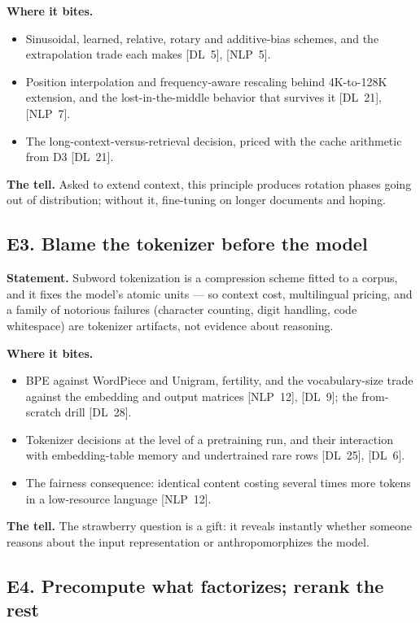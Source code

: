 \textbf{Where it bites.}
\begin{itemize}[itemsep=1pt,topsep=2pt,leftmargin=1.3em]
\item Sinusoidal, learned, relative, rotary and additive-bias schemes, and the extrapolation trade each makes [DL~5], [NLP~5].
\item Position interpolation and frequency-aware rescaling behind 4K-to-128K extension, and the lost-in-the-middle behavior that survives it [DL~21], [NLP~7].
\item The long-context-versus-retrieval decision, priced with the cache arithmetic from D3 [DL~21].
\end{itemize}

\textbf{The tell.} Asked to extend context, this principle produces rotation phases going out of distribution; without it, fine-tuning on longer documents and hoping.

\subsection*{E3. Blame the tokenizer before the model}

\textbf{Statement.} Subword tokenization is a compression scheme fitted to a corpus, and it fixes the model's atomic units --- so context cost, multilingual pricing, and a family of notorious failures (character counting, digit handling, code whitespace) are tokenizer artifacts, not evidence about reasoning.

\textbf{Where it bites.}
\begin{itemize}[itemsep=1pt,topsep=2pt,leftmargin=1.3em]
\item BPE against WordPiece and Unigram, fertility, and the vocabulary-size trade against the embedding and output matrices [NLP~12], [DL~9]; the from-scratch drill [DL~28].
\item Tokenizer decisions at the level of a pretraining run, and their interaction with embedding-table memory and undertrained rare rows [DL~25], [DL~6].
\item The fairness consequence: identical content costing several times more tokens in a low-resource language [NLP~12].
\end{itemize}

\textbf{The tell.} The strawberry question is a gift: it reveals instantly whether someone reasons about the input representation or anthropomorphizes the model.

\subsection*{E4. Precompute what factorizes; rerank the rest}

